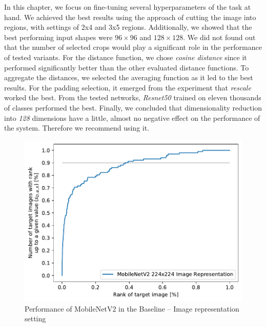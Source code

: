 In this chapter, we focus on fine-tuning several hyperparameters of the task at hand. We achieved the best results using the approach of cutting the image into regions, with settings of 2x4 and 3x5 regions. Additionally, we showed that the best performing input shapes were $96\times 96$ and $128 \times 128$.  We did not found out that the number of selected crops would play a significant role in the performance of tested variants. For the distance function, we chose \emph{cosine distance} since it performed significantly better than the other evaluated distance functions. To aggregate the distances, we selected the averaging function as it led to the best results. For the padding selection, it emerged from the experiment that \emph{rescale} worked the best. From the tested networks, \emph{Resnet50} trained on eleven thousands of classes performed the best. Finally, we concluded that dimensionality reduction into \emph{128} dimensions have a little, almost no negative effect on the performance of the system. Therefore we recommend using it. 



\begin{figure}
    \centering
    \includegraphics[width=0.8\linewidth]{graphs/dd20090d2f746141e927422ef0528eed6141a2d1478d86afe3d450e0c99e9765.pdf}
    \caption{Performance of MobileNetV2 in the Baseline -- Image representation setting}
    \label{fig:mobilenet_whole_image_example}
\end{figure}

